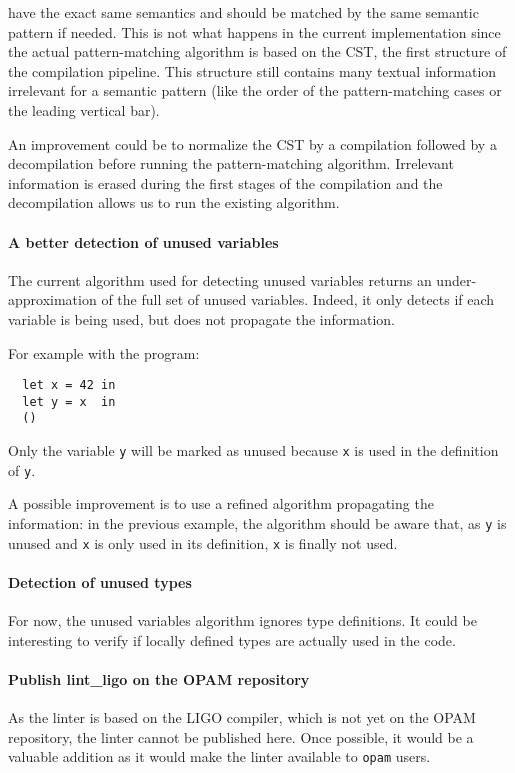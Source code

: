 \documentclass[10pt,a4paper]{article}
\begin{document}
have the exact same semantics and should be matched by the same
semantic pattern if needed. This is not what happens in the current
implementation since the actual pattern-matching algorithm is based on
the CST, the first structure of the compilation pipeline. This
structure still contains many textual information irrelevant for a
semantic pattern (like the order of the pattern-matching cases or the
leading vertical bar).

An improvement could be to normalize the CST by a compilation followed
by a decompilation before running the pattern-matching
algorithm. Irrelevant information is erased during the first stages of
the compilation and the decompilation allows us to run the existing
algorithm.

\paragraph{A better detection of unused variables}

The current algorithm used for detecting unused variables returns an
under-approximation of the full set of unused variables. Indeed, it
only detects if each variable is being used, but does not propagate
the information.

For example with the program:
\begin{verbatim}
  let x = 42 in
  let y = x  in
  ()
\end{verbatim}

Only the variable \verb|y| will be marked as unused because
\verb|x| is used in the definition of \verb|y|.

A possible improvement is to use a refined algorithm propagating the
information: in the previous example, the algorithm should be aware
that, as \verb|y| is unused and \verb|x| is only used in its
definition, \verb|x| is finally not used.

\paragraph{Detection of unused types}

For now, the unused variables algorithm ignores type definitions. It
could be interesting to verify if locally defined types are actually
used in the code.

\paragraph{Publish lint\_ligo on the OPAM repository}

As the linter is based on the LIGO compiler, which is not yet on the
OPAM repository, the linter cannot be published here. Once possible,
it would be a valuable addition as it would make the linter available
to \verb|opam| users.
\end{document}
